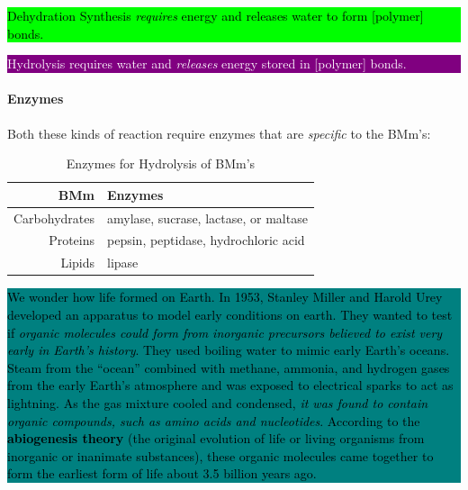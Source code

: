 \documentclass[12pt]{article}
\newcommand{\ctext}[3]{
    \colorbox{#2}{\parbox{0.9\textwidth}{\textcolor{#1}{#3}}}
}
\begin{document}
\ctext{black}{lime}{
    Dehydration Synthesis \emph{requires} energy and releases water to form [polymer] bonds.
}
\par
\ctext{white}{purple}{
    Hydrolysis requires water and \emph{releases} energy stored in [polymer] bonds.
}

\paragraph{Enzymes}
Both these kinds of reaction require enzymes that are \emph{specific} to the BMm's:
\begin{table}[htbp!]
  \begin{center}
    \caption{Enzymes for Hydrolysis of BMm's}
    \label{tab:enzymes-bmms}
    \begin{tabular}{|r|l|} 
      \hline
      \textbf{BMm} & \textbf{Enzymes}\\
      \hline
      Carbohydrates & amylase, sucrase, lactase, or maltase\\
      \hline
      Proteins & pepsin, peptidase, hydrochloric acid\\
      \hline
      Lipids & lipase\\
      \hline
    \end{tabular}
  \end{center}
\end{table}


\ctext{black}{teal}{
    \small{
        We wonder how life formed on Earth. In 1953, Stanley Miller and Harold Urey developed an apparatus to model early conditions on earth. They wanted to test if \emph{organic molecules could form from inorganic precursors believed to exist very early in Earth’s history}. They used boiling water to mimic early Earth’s oceans. Steam from the “ocean” combined with methane, ammonia, and hydrogen gases from the early Earth’s atmosphere and was exposed to electrical sparks to act as lightning. As the gas mixture cooled and condensed, \emph{it was found to contain organic compounds, such as amino acids and nucleotides}. According to the \textbf{abiogenesis theory} (the original evolution of life or living organisms from inorganic or inanimate substances), these organic molecules came together to form the earliest form of life about 3.5 billion years ago.
   }
}
\end{document}
